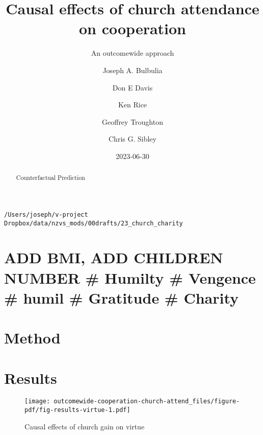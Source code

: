 \documentclass[
  singlecolumn]{report}
\title{Causal effects of church attendance on cooperation}
\subtitle{An outcomewide approach}
\author{Joseph A. Bulbulia \and Don E Davis \and Ken Rice \and Geoffrey
Troughton \and Chris G. Sibley}
\date{2023-06-30}
\begin{document}
\maketitle
\begin{abstract}
Counterfactual Prediction
\end{abstract}
\ifdefined\Shaded\renewenvironment{Shaded}{\begin{tcolorbox}[enhanced, borderline west={3pt}{0pt}{shadecolor}, sharp corners, boxrule=0pt, interior hidden, frame hidden, breakable]}{\end{tcolorbox}}\fi

\listoffigures
\listoftables
\begin{verbatim}
/Users/joseph/v-project Dropbox/data/nzvs_mods/00drafts/23_church_charity
\end{verbatim}

\hypertarget{add-bmi-add-children-number-humilty-vengence-humil-gratitude-charity}{%
\section{ADD BMI, ADD CHILDREN NUMBER \# Humilty \# Vengence \# humil \#
Gratitude \#
Charity}\label{add-bmi-add-children-number-humilty-vengence-humil-gratitude-charity}}

\hypertarget{method}{%
\section{Method}\label{method}}

\hypertarget{results}{%
\section{Results}\label{results}}

\begin{figure}

{\centering \texttt{[image: outcomewide-cooperation-church-attend\_files/figure-pdf/fig-results-virtue-1.pdf]}

}

\caption{\label{fig-results-virtue}Causal effects of church gain on
virtue}

\end{figure}
\end{document}
